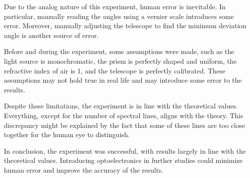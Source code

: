 \documentclass[10pt]{article}
\begin{document}
Due to the analog nature of this experiment, human error is inevitable. In particular, manually reading the angles using a vernier scale introduces some error. Moreover, manually adjusting the telescope to find the minimum deviation angle is another source of error.

Before and during the experiment, some assumptions were made, such as the light source is monochromatic, the prism is perfectly shaped and uniform, the refractive index of air is 1, and the telescope is perfectly calibrated. These assumptions may not hold true in real life and may introduce some error to the results.

Despite these limitations, the experiment is in line with the theoretical values. Everything, except for the number of spectral lines, aligns with the theory. This discrepancy might be explained by the fact that some of these lines are too close together for the human eye to distinguish.

In conclusion, the experiment was successful, with results largely in line with the theoretical values. Introducing optoelectronics in further studies could minimize human error and improve the accuracy of the results.
\printbibliography
\end{document}
